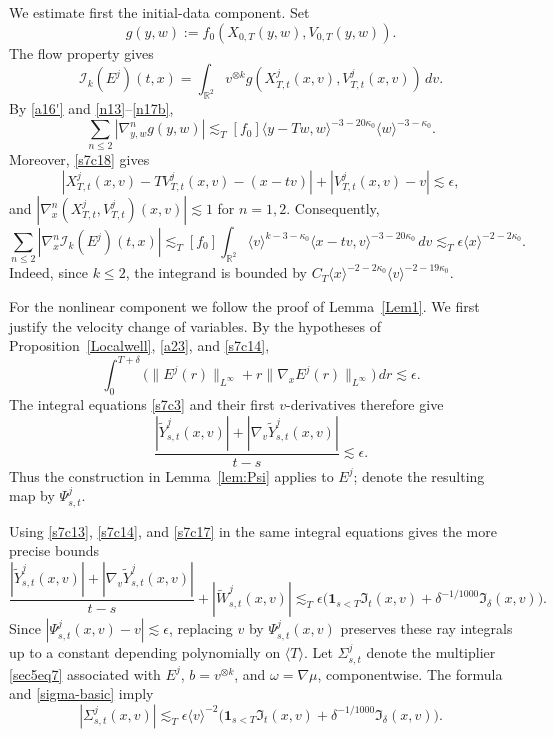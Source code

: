 \documentclass[reqno,11pt]{amsart}
\numberwithin{equation}{section}
\def\R{{\mathbb R}}
\def\R{{\bf R}}
\def\R{\mathbb{R}}
\begin{document}
We estimate first the initial-data component. Set
\begin{equation}\label{s7c24}
g(y,w):=f_0(X_{0,T}(y,w),V_{0,T}(y,w)).
\end{equation}
The flow property gives
\[
\mathcal I_k(E^j)(t,x)=\int_{\R^2}v^{\otimes k}
g(X^j_{T,t}(x,v),V^j_{T,t}(x,v))\,dv.
\]
By \eqref{a16'} and \eqref{n13}--\eqref{n17b},
\begin{equation}\label{s7c25}
\sum_{n\leq2}|\nabla_{y,w}^ng(y,w)|
\lesssim_T[f_0]\langle y-Tw,w\rangle^{-3-20\kappa_0}
\langle w\rangle^{-3-\kappa_0}.
\end{equation}
Moreover, \eqref{s7c18} gives
\[
|X^j_{T,t}(x,v)-TV^j_{T,t}(x,v)-(x-tv)|
+|V^j_{T,t}(x,v)-v|\lesssim\epsilon,
\]
and $|\nabla_x^n(X^j_{T,t},V^j_{T,t})(x,v)|\lesssim1$
for $n=1,2$. Consequently,
\begin{equation}\label{s7c26}
\sum_{n\leq2}|\nabla_x^n\mathcal I_k(E^j)(t,x)|\lesssim_T[f_0]\int_{\R^2}
\langle v\rangle^{k-3-\kappa_0}
\langle x-tv,v\rangle^{-3-20\kappa_0}\,dv\lesssim_T\epsilon\langle x\rangle^{-2-2\kappa_0}.
\end{equation}
Indeed, since $k\leq2$, the integrand is bounded by
$C_T\langle x\rangle^{-2-2\kappa_0}
\langle v\rangle^{-2-19\kappa_0}$.

For the nonlinear component we follow the proof of
Lemma~\ref{Lem1}. We first justify the velocity change of variables.
By the hypotheses of Proposition~\ref{Localwell}, \eqref{a23}, and \eqref{s7c14},
\[
\int_0^{T+\delta}
\big(\|E^j(r)\|_{L^\infty}
+r\|\nabla_xE^j(r)\|_{L^\infty}\big)\,dr
\lesssim\epsilon.
\]
The integral equations \eqref{s7c3} and their first $v$-derivatives
therefore give
\[
\frac{|\widetilde Y^j_{s,t}(x,v)|
+|\nabla_v\widetilde Y^j_{s,t}(x,v)|}{t-s}
\lesssim\epsilon.
\]
Thus the construction in Lemma~\ref{lem:Psi} applies to $E^j$;
denote the resulting map by $\Psi^j_{s,t}$.

Using \eqref{s7c13}, \eqref{s7c14}, and \eqref{s7c17}
in the same integral equations gives the more precise bounds
\[
\frac{|\widetilde Y^j_{s,t}(x,v)|
+|\nabla_v\widetilde Y^j_{s,t}(x,v)|}{t-s}
+|\widetilde W^j_{s,t}(x,v)|
\lesssim_T\epsilon\big(
\mathbf1_{s<T}\mathfrak I_t(x,v)
+\delta^{-1/1000}\mathfrak I_\delta(x,v)\big).
\]
Since $|\Psi^j_{s,t}(x,v)-v|\lesssim\epsilon$, replacing $v$
by $\Psi^j_{s,t}(x,v)$ preserves these ray integrals up to
a constant depending polynomially on $\langle T\rangle$.
Let $\Sigma^j_{s,t}$ denote the multiplier \eqref{sec5eq7}
associated with $E^j$, $b=v^{\otimes k}$, and
$\omega=\nabla\mu$, componentwise.
The formula and \eqref{sigma-basic} imply
\begin{equation}\label{sec7-Sigma}
|\Sigma^j_{s,t}(x,v)|
\lesssim_T\epsilon\langle v\rangle^{-2}
\big(\mathbf1_{s<T}\mathfrak I_t(x,v)
+\delta^{-1/1000}\mathfrak I_\delta(x,v)\big).
\end{equation}
\end{document}
